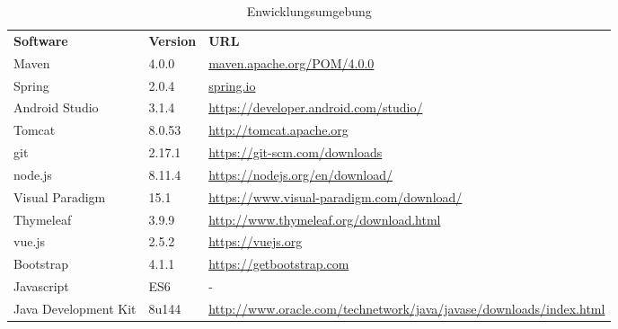 \begin{table}[h]
	\centering
	\begin{tabularx}{\textwidth}{l l X}
		\rowcolor[HTML]{C0C0C0}
		\textbf{Software} & \textbf{Version} & \textbf{URL} \\
		\rowcolor[HTML]{E7E7E7}
		Maven & 4.0.0 & \url{maven.apache.org/POM/4.0.0} \\
		Spring & 2.0.4 & \url{spring.io} \\
		\rowcolor[HTML]{E7E7E7}
		Android Studio & 3.1.4 & \url{https://developer.android.com/studio/}\\
		Tomcat & 8.0.53 & \url{http://tomcat.apache.org} \\
		\rowcolor[HTML]{E7E7E7}
		git & 2.17.1 & \url{https://git-scm.com/downloads} \\
		node.js & 8.11.4 & \url{https://nodejs.org/en/download/} \\
		\rowcolor[HTML]{E7E7E7}
		Visual Paradigm & 15.1 & \url{https://www.visual-paradigm.com/download/}\\
		Thymeleaf & 3.9.9 & \url{http://www.thymeleaf.org/download.html} \\
		\rowcolor[HTML]{E7E7E7}
		vue.js & 2.5.2 & \url{https://vuejs.org} \\
		Bootstrap & 4.1.1 & \url{https://getbootstrap.com} \\
		\rowcolor[HTML]{E7E7E7}
		Javascript & ES6 & - \\
		Java Development Kit & 8u144 & \url{http://www.oracle.com/technetwork/java/javase/downloads/index.html}

	\end{tabularx}
	\caption{Enwicklungsumgebung}
	\label{table:entwicklungsumgebung}
\end{table}